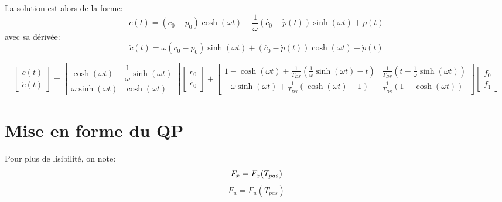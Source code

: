 \documentclass[10pt,a4paper]{article}
\begin{document}
La solution est alors de la forme:
\begin{equation}
c(t)=(c_0-p_0)\cosh(\omega t)+\dfrac{1}{\omega}(\dot{c_0}-\dot{p}(t))\sinh(\omega t)+p(t)
\end{equation}
avec sa dérivée:
\begin{equation}
\dot{c}(t)=\omega(c_0-p_0)\sinh(\omega t)+(\dot{c_0}-\dot{p}(t))\cosh(\omega t)+\dot{p}(t)
\end{equation}



\begin{equation}
\begin{bmatrix} 
c(t) \\
\dot{c}(t) 
\end{bmatrix} 
= 
\begin{bmatrix} 
\cosh(\omega t) 		&	 \dfrac{1}{\omega}\sinh(\omega t) \\
\omega\sinh(\omega t)	&	 \cosh(\omega t)
\end{bmatrix}
\begin{bmatrix} 
c_0 \\
\dot{c_0}
\end{bmatrix} 
+
\begin{bmatrix} 
1-\cosh(\omega t)+ \frac{1}{T_{DS}}(\frac{1}{\omega}\sinh(\omega t)-t)	& \frac{1}{T_{DS}}(t-\frac{1}{\omega}\sinh(\omega t)) \\
-\omega\sinh(\omega t)+	\frac{1}{T_{DS}}(\cosh(\omega t)-1) & 	\frac{1}{T_{DS}}(1-\cosh(\omega t))
\end{bmatrix}
\begin{bmatrix} 
f_0 \\
f_1
\end{bmatrix}
\end{equation}
\section{Mise en forme du QP}
Pour plus de lisibilité, on note:
\begin{equation}
F_x=F_x(T_{pas})  \linebreak
\end{equation} 
\begin{equation}
F_u=F_u(T_{pas})
\end{equation} 
\end{document}
